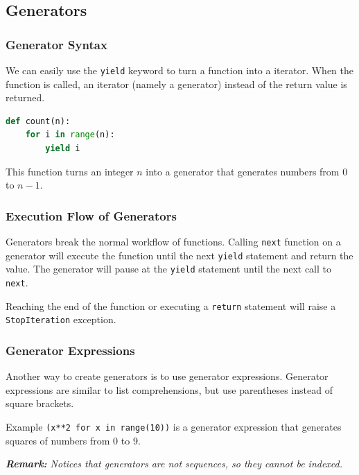 \documentclass[beamer, en, version=2.0]{huangfusl-template}
\begin{document}
    \subsection{Generators}
    \begin{frame}[fragile]
        \frametitle{Generator Syntax}

        We can easily use the {\footnotesize\verb|yield|} keyword to turn a function into a iterator. When the function is called, an iterator (namely a generator) instead of the return value is returned.

\begin{lstlisting}[language=python]
def count(n):
    for i in range(n):
        yield i
\end{lstlisting}

        This function turns an integer $n$ into a generator that generates numbers from 0 to $n-1$.
    \end{frame}
    \begin{frame}[fragile]
        \frametitle{Execution Flow of Generators}

        Generators break the normal workflow of functions. Calling {\footnotesize\verb|next|} function on a generator will execute the function until the next {\footnotesize\verb|yield|} statement and return the value. The generator will pause at the {\footnotesize\verb|yield|} statement until the next call to {\footnotesize\verb|next|}.

        Reaching the end of the function or executing a {\footnotesize\verb|return|} statement will raise a {\footnotesize\verb|StopIteration|} exception.
    \end{frame}
    \begin{frame}[fragile]
        \frametitle{Generator Expressions}

        Another way to create generators is to use generator expressions. Generator expressions are similar to list comprehensions, but use parentheses instead of square brackets.

        \begin{block}{Example}
            {\footnotesize\verb|(x**2 for x in range(10))|} is a generator expression that generates squares of numbers from 0 to 9.
        \end{block}

        {\footnotesize\itshape\textbf{Remark:} Notices that generators are not sequences, so they cannot be indexed.}
    \end{frame}
\end{document}

